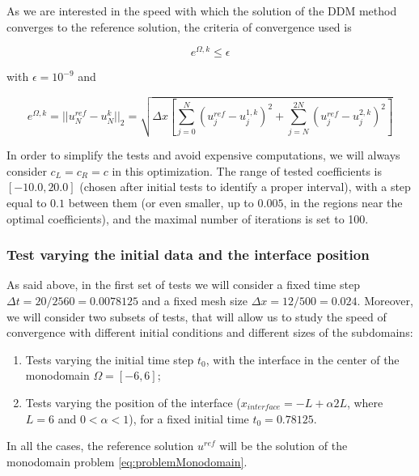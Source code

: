 \indent As we are interested in the speed with which the solution of the DDM method converges to the reference solution, the criteria of convergence used is

\begin{equation*}
	e^{\Omega,k} \leq \epsilon
\end{equation*}

\noindent with $\epsilon = 10^{-9}$ and 

\begin{equation*}
	e^{\Omega,k} = ||u^{ref}_N - u^{k}_N||_2 = \sqrt{\Delta x \left[ \sum_{j=0}^N{(u^{ref}_j - u^{1,k}_j)^2 } + \sum_{j=N}^{2N}{(u^{ref}_j - u^{2,k}_j)^2 } \right] }
\end{equation*}
 
\indent In order to simplify the tests and avoid expensive computations, we will always consider $c_L = c_R = c$ in this optimization. The range of tested coefficients is $[-10.0, 20.0]$ (chosen after initial tests to identify a proper interval), with a step equal to  $0.1$ between them (or even smaller, up to $0.005$, in the regions near the optimal coefficients), and the maximal number of iterations is set to 100.

\subsubsection{Test varying the initial data and the interface position}

\indent As said above, in the first set of tests we will consider a fixed time step $\Delta t = 20/2560 = 0.0078125$ and a fixed mesh size $\Delta x = 12/500 = 0.024$. Moreover, we will consider two subsets of tests, that will allow us to study the speed of convergence with different initial conditions and different sizes of the subdomains:

\begin{enumerate}
	\item Tests varying the initial time step $t_0$, with the interface in the center of the monodomain $\Omega = [-6,6]$;
	\item Tests varying the position of the interface ($x_{interface} = -L + \alpha 2L$, where $L = 6$ and $0 < \alpha < 1$), for a fixed initial time $t_0 = 0.78125$.
\end{enumerate}

\indent In all the cases, the reference solution $u^{ref}$ will be the solution of the monodomain problem \eqref{eq:problemMonodomain}.

